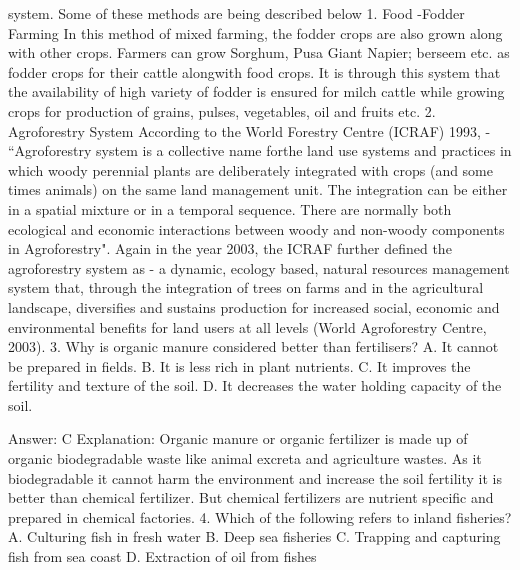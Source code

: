 system. Some of these methods are being described below 1. Food -Fodder Farming In this method of mixed farming, the fodder crops are also grown along with other crops. Farmers can grow Sorghum, Pusa Giant Napier; berseem etc. as fodder crops for their cattle alongwith food crops. It is through this system that the availability of high variety of fodder is ensured for milch cattle while growing crops for production of grains, pulses, vegetables, oil and fruits etc. 2. Agroforestry System According to the World Forestry Centre (ICRAF) 1993, - “Agroforestry system is a collective name forthe land use systems and practices in which woody perennial plants are deliberately integrated with crops (and some times animals) on the same land management unit. The integration can be either in a spatial mixture or in a temporal sequence. There are normally both ecological and economic interactions between woody and non-woody components in Agroforestry". Again in the year 2003, the ICRAF further defined the agroforestry system as - a dynamic, ecology based, natural resources management system that, through the integration of trees on farms and in the agricultural landscape, diversifies and sustains production for increased social, economic and environmental benefits for land users at all levels (World Agroforestry Centre, 2003). 3. Why is organic manure considered better than fertilisers? A. It cannot be prepared in fields. B. It is less rich in plant nutrients. C. It improves the fertility and texture of the soil. D. It decreases the water holding capacity of the soil. 

Answer: C
Explanation: Organic manure or organic fertilizer is made up of organic biodegradable waste like animal excreta and agriculture wastes. As it biodegradable it cannot harm the environment and increase the soil fertility it is better than chemical fertilizer. But chemical fertilizers are nutrient specific and prepared in chemical factories. 4. Which of the following refers to inland fisheries? A. Culturing fish in fresh water B. Deep sea fisheries C. Trapping and capturing fish from sea coast D. Extraction of oil from fishes 


